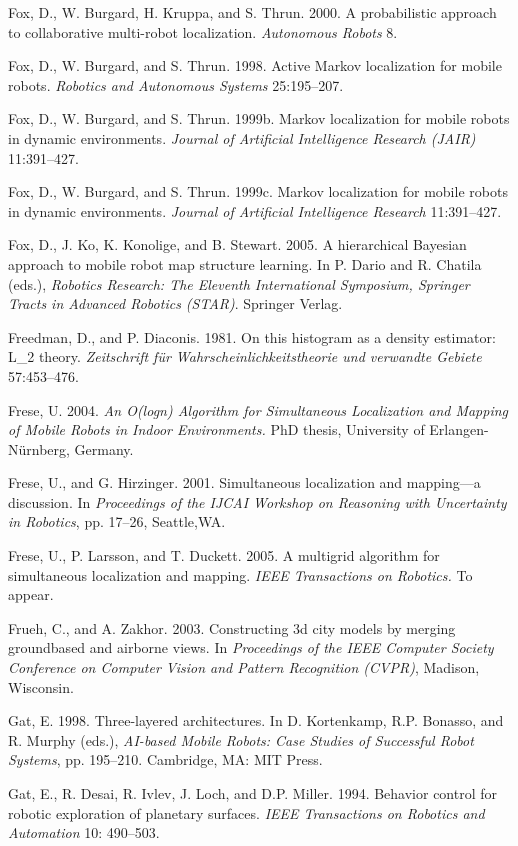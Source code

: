 \documentclass[10pt,a4paper]{article}
\begin{document}
Fox, D., W. Burgard, H. Kruppa, and S. Thrun. 2000. A probabilistic approach to
collaborative multi-robot localization. \textit{Autonomous Robots} 8.

Fox, D., W. Burgard, and S. Thrun. 1998. Active Markov localization for mobile
robots. \textit{Robotics and Autonomous Systems} 25:195–207.

Fox, D., W. Burgard, and S. Thrun. 1999b. Markov localization for mobile robots in
dynamic environments. \textit{Journal of Artificial Intelligence Research (JAIR)} 11:391–427.

Fox, D., W. Burgard, and S. Thrun. 1999c. Markov localization for mobile robots in
dynamic environments. \textit{Journal of Artificial Intelligence Research} 11:391–427.

Fox, D., J. Ko, K. Konolige, and B. Stewart. 2005. A hierarchical Bayesian approach to
mobile robot map structure learning. In P. Dario and R. Chatila (eds.), \textit{Robotics Research:
The Eleventh International Symposium, Springer Tracts in Advanced Robotics
(STAR)}. Springer Verlag.

Freedman, D., and P. Diaconis. 1981. On this histogram as a density estimator: L\_2
theory. \textit{Zeitschrift für Wahrscheinlichkeitstheorie und verwandte Gebiete} 57:453–476.

Frese, U. 2004. \textit{An O(logn) Algorithm for Simultaneous Localization and Mapping of
Mobile Robots in Indoor Environments.} PhD thesis, University of Erlangen-Nürnberg,
Germany.

Frese, U., and G. Hirzinger. 2001. Simultaneous localization and mapping—a discussion.
In \textit{Proceedings of the IJCAI Workshop on Reasoning with Uncertainty in Robotics},
pp. 17–26, Seattle,WA.

Frese, U., P. Larsson, and T. Duckett. 2005. A multigrid algorithm for simultaneous
localization and mapping. \textit{IEEE Transactions on Robotics.} To appear.

Frueh, C., and A. Zakhor. 2003. Constructing 3d city models by merging groundbased
and airborne views. In \textit{Proceedings of the IEEE Computer Society Conference on
Computer Vision and Pattern Recognition (CVPR)}, Madison, Wisconsin.

Gat, E. 1998. Three-layered architectures. In D. Kortenkamp, R.P. Bonasso, and
R. Murphy (eds.), \textit{AI-based Mobile Robots: Case Studies of Successful Robot Systems},
pp. 195–210. Cambridge, MA: MIT Press.

Gat, E., R. Desai, R. Ivlev, J. Loch, and D.P. Miller. 1994. Behavior control for robotic
exploration of planetary surfaces. \textit{IEEE Transactions on Robotics and Automation} 10:
490–503.
\end{document}
